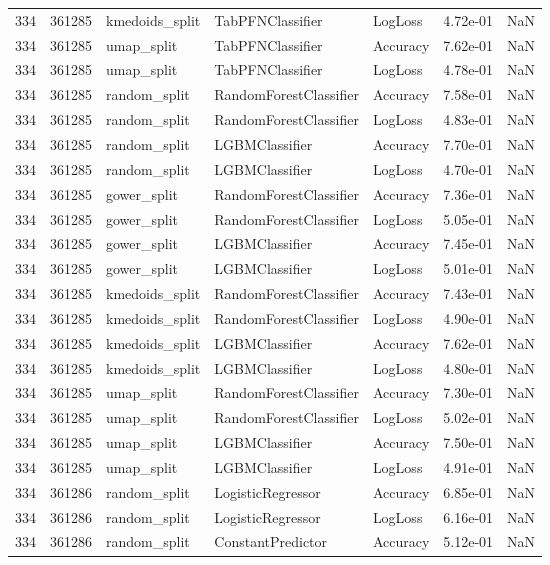 \begin{tabular}{rrlllrr}
334 & 361285 & kmedoids\_split & TabPFNClassifier & LogLoss & 4.72e-01 & NaN \\
334 & 361285 & umap\_split & TabPFNClassifier & Accuracy & 7.62e-01 & NaN \\
334 & 361285 & umap\_split & TabPFNClassifier & LogLoss & 4.78e-01 & NaN \\
334 & 361285 & random\_split & RandomForestClassifier & Accuracy & 7.58e-01 & NaN \\
334 & 361285 & random\_split & RandomForestClassifier & LogLoss & 4.83e-01 & NaN \\
334 & 361285 & random\_split & LGBMClassifier & Accuracy & 7.70e-01 & NaN \\
334 & 361285 & random\_split & LGBMClassifier & LogLoss & 4.70e-01 & NaN \\
334 & 361285 & gower\_split & RandomForestClassifier & Accuracy & 7.36e-01 & NaN \\
334 & 361285 & gower\_split & RandomForestClassifier & LogLoss & 5.05e-01 & NaN \\
334 & 361285 & gower\_split & LGBMClassifier & Accuracy & 7.45e-01 & NaN \\
334 & 361285 & gower\_split & LGBMClassifier & LogLoss & 5.01e-01 & NaN \\
334 & 361285 & kmedoids\_split & RandomForestClassifier & Accuracy & 7.43e-01 & NaN \\
334 & 361285 & kmedoids\_split & RandomForestClassifier & LogLoss & 4.90e-01 & NaN \\
334 & 361285 & kmedoids\_split & LGBMClassifier & Accuracy & 7.62e-01 & NaN \\
334 & 361285 & kmedoids\_split & LGBMClassifier & LogLoss & 4.80e-01 & NaN \\
334 & 361285 & umap\_split & RandomForestClassifier & Accuracy & 7.30e-01 & NaN \\
334 & 361285 & umap\_split & RandomForestClassifier & LogLoss & 5.02e-01 & NaN \\
334 & 361285 & umap\_split & LGBMClassifier & Accuracy & 7.50e-01 & NaN \\
334 & 361285 & umap\_split & LGBMClassifier & LogLoss & 4.91e-01 & NaN \\
334 & 361286 & random\_split & LogisticRegressor & Accuracy & 6.85e-01 & NaN \\
334 & 361286 & random\_split & LogisticRegressor & LogLoss & 6.16e-01 & NaN \\
334 & 361286 & random\_split & ConstantPredictor & Accuracy & 5.12e-01 & NaN \\

\end{tabular}
